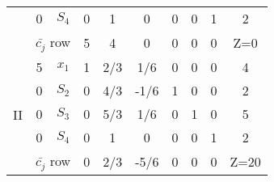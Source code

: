 \documentclass[../main-sheet.tex]{subfiles}
\begin{document}
\begin{soln}
\begin{table}[H]
\begin{tabular}{cccccccccc}
                                    & 0                                     & $ S_4 $                                        & \cellcolor[rgb]{ 1,  .8,  .788}0   & 1                                    & 0                                   & 0                                & 0                                & 1                                & 2         \\
            \cmidrule{2-10}         & \multicolumn{2}{c}{$ \bar{c_j} $ row} & 5                                              & 4                                  & 0                                    & 0                                   & 0                                & 0                                & Z=0                                          \\
            \midrule
            \multirow{5}[4]{*}{II}  & 5                                     & $x_1$                                          & 1                                  & \cellcolor[rgb]{ 1,  .8,  .788}2/3   & 1/6                                 & 0                                & 0                                & 0                                & 4         \\
                                    & 0                                     & $S_2$                                          & \cellcolor[rgb]{ .604,  1,  .6}0   & \cellcolor[rgb]{ .588,  1,  .984}4/3 & \cellcolor[rgb]{ .604,  1,  .6}-1/6 & \cellcolor[rgb]{ .604,  1,  .6}1 & \cellcolor[rgb]{ .604,  1,  .6}0 & \cellcolor[rgb]{ .604,  1,  .6}0 & 2         \\
                                    & 0                                     & $S_3$                                          & 0                                  & \cellcolor[rgb]{ 1,  .8,  .788}5/3   & 1/6                                 & 0                                & 1                                & 0                                & 5         \\
                                    & 0                                     & $S_4$                                          & 0                                  & \cellcolor[rgb]{ 1,  .8,  .788}1     & 0                                   & 0                                & 0                                & 1                                & 2         \\
            \cmidrule{2-10}         & \multicolumn{2}{c}{$ \bar{c_j} $ row} & 0                                              & 2/3                                & -5/6                                 & 0                                   & 0                                & 0                                & Z=20                                         \\

\end{tabular}
\end{table}
\end{soln}
\end{document}
